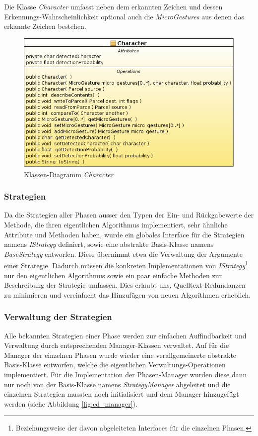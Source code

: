 Die Klasse \emph{Character} umfasst neben dem erkannten Zeichen und dessen Erkennungs-Wahrscheinlichkeit optional auch die \emph{MicroGestures} aus denen das erkannte Zeichen bestehen.

\begin{figure}[h!]
   \centering
   \includegraphics[scale=0.5]{img/uml_cd_char} 
   \caption{Klassen-Diagramm \emph{Character}}
   \label{fig:cd_character}
\end{figure}

\subsubsection{Strategien}

Da die Strategien aller Phasen ausser den Typen der Ein- und Rückgabewerte der Methode, die ihren eigentlichen Algorithmus implementiert, sehr ähnliche Attribute und Methoden haben, wurde ein globales Interface für die Strategien namens \emph{IStrategy} definiert, sowie eine abstrakte Basis-Klasse namens \emph{BaseStrategy} entworfen. Diese übernimmt etwa die Verwaltung der Argumente einer Strategie. Dadurch müssen die konkreten Implementationen von \emph{IStrategy}\footnote{Beziehungsweise der davon abgeleiteten Interfaces für die einzelnen Phasen.} nur den eigentlichen Algorithmus sowie ein paar einfache Methoden zur Beschreibung der Strategie umfassen. Dies erlaubt uns, Quelltext-Redundanzen zu minimieren und vereinfacht das Hinzufügen von neuen Algorithmen erheblich.

\subsubsection{Verwaltung der Strategien}

Alle bekannten Strategien einer Phase werden zur einfachen Auffindbarkeit und Verwaltung durch entsprechenden Manager-Klassen verwaltet. Auf für die Manager der einzelnen Phasen wurde wieder eine verallgemeinerte abstrakte Basis-Klasse entworfen, welche die eigentlichen Verwaltungs-Operationen implementiert. Für die Implementation der Phasen-Manager wurden diese dann nur noch von der Basis-Klasse namens \emph{StrategyManager} abgeleitet und die einzelnen Strategien mussten noch initialisiert und dem Manager hinzugefügt werden (siehe Abbildung \ref{fig:cd_manager}).

